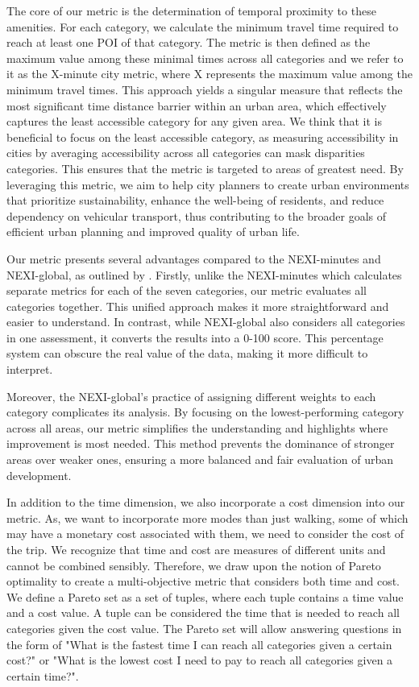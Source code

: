 The core of our metric is the determination of temporal proximity to these amenities. 
For each category, we calculate the minimum travel time required to reach at least one POI of that category. 
The metric is then defined as the maximum value among these minimal times across all categories and we refer to it as the X-minute city metric, where X represents the maximum value among the minimum travel times.
This approach yields a singular measure that reflects the most significant time distance barrier within an urban area, which effectively captures the least accessible category for any given area.
We think that it is beneficial to focus on the least accessible category, as measuring accessibility in cities by averaging accessibility across all categories can mask disparities categories. 
This ensures that the metric is targeted to areas of greatest need. 
By leveraging this metric, we aim to help city planners to create urban environments that prioritize sustainability, enhance the well-being of residents, and reduce dependency on vehicular transport, thus contributing to the broader goals of efficient urban planning and improved quality of urban life.

Our metric presents several advantages compared to the NEXI-minutes and NEXI-global, as outlined by .
Firstly, unlike the NEXI-minutes which calculates separate metrics for each of the seven categories, our metric evaluates all categories together. 
This unified approach makes it more straightforward and easier to understand. 
In contrast, while NEXI-global also considers all categories in one assessment, it converts the results into a 0-100 score. 
This percentage system can obscure the real value of the data, making it more difficult to interpret.

Moreover, the NEXI-global's practice of assigning different weights to each category complicates its analysis. 
By focusing on the lowest-performing category across all areas, our metric simplifies the understanding and highlights where improvement is most needed. 
This method prevents the dominance of stronger areas over weaker ones, ensuring a more balanced and fair evaluation of urban development. 

In addition to the time dimension, we also incorporate a cost dimension into our metric.
As, we want to incorporate more modes than just walking, some of which may have a monetary cost associated with them, we need to consider the cost of the trip.
We recognize that time and cost are measures of different units and cannot be combined sensibly.
Therefore, we draw upon the notion of Pareto optimality to create a multi-objective metric that considers both time and cost.
We define a Pareto set as a set of tuples, where each tuple contains a time value and a cost value.
A tuple can be considered the time that is needed to reach all categories given the cost value.
The Pareto set will allow answering questions in the form of "What is the fastest time I can reach all categories given a certain cost?" or "What is the lowest cost I need to pay to reach all categories given a certain time?".

